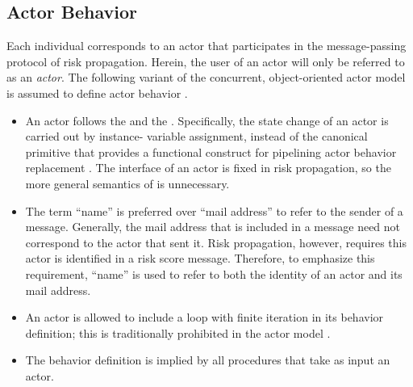 \subsection{Actor Behavior}\label{sec:actor-behavior}

Each individual corresponds to an actor that participates in the message-passing protocol of risk propagation. Herein, the user of an actor will only be referred to as an \emph{actor}. The following variant of the concurrent, object-oriented actor model is assumed to define actor behavior \citep{Agha1985}.

\begin{itemize}
  \item An actor follows the  \citep{Lavender1996, Koster2016} and the  \citep{Koster2016}. Specifically, the state change of an actor is carried out by instance- variable assignment, instead of the canonical \cBecome{} primitive that provides a functional construct for pipelining actor behavior replacement \citep{Agha1985}. The interface of an actor is fixed in risk propagation, so the more general semantics of \cBecome{} is unnecessary.
  \item The term ``name'' \citep{Hewitt1977, Agha1985} is preferred over ``mail address'' \citep{Agha1985} to refer to the sender of a message. Generally, the mail address that is included in a message need not correspond to the actor that sent it. Risk propagation, however, requires this actor is identified in a risk score message. Therefore, to emphasize this requirement, ``name'' is used to refer to both the identity of an actor and its mail address.
  \item An actor is allowed to include a loop with finite iteration in its behavior definition; this is traditionally prohibited in the actor model \citep{Agha1985}.
  \item The behavior definition is implied by all procedures that take as input an actor.
\end{itemize}

